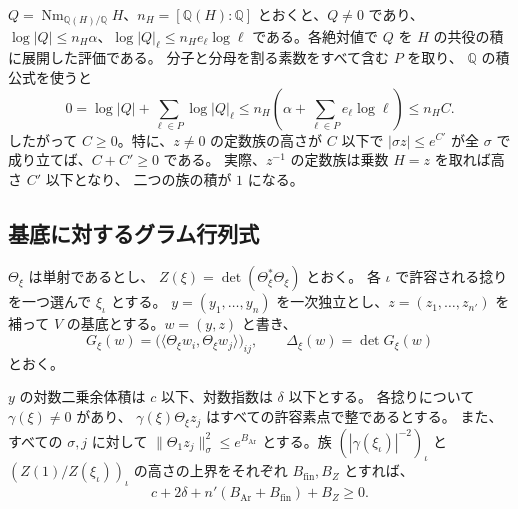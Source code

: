 \(Q=\operatorname{Nm}_{\mathbb Q(H)/\mathbb Q}H\)、\(n_H=[\mathbb Q(H):\mathbb Q]\)
とおくと、\(Q\ne0\) であり、
\(\log|Q|\le n_H\alpha\)、\(\log|Q|_\ell\le n_H e_\ell\log\ell\)
である。各絶対値で \(Q\) を \(H\) の共役の積に展開した評価である。
分子と分母を割る素数をすべて含む \(P\) を取り、
\(\mathbb Q\) の積公式を使うと
\[
 0=\log|Q|+\sum_{\ell\in P}\log|Q|_\ell
   \le n_H\left(\alpha+\sum_{\ell\in P} e_\ell\log\ell\right)
   \le n_H C .
\]
したがって \(C\ge0\)。特に、\(z\ne0\) の定数族の高さが \(C\) 以下で
\(|\sigma z|\le e^{C'}\) が全 \(\sigma\) で成り立てば、\(C+C'\ge0\) である。
実際、\(z^{-1}\) の定数族は乗数 \(H=z\) を取れば高さ \(C'\) 以下となり、
二つの族の積が \(1\) になる。

\subsection{基底に対するグラム行列式}

\(\Theta_\xi\) は単射であるとし、
\(Z(\xi)=\det(\Theta_\xi^*\Theta_\xi)\) とおく。
各 \(\iota\) で許容される捻りを一つ選んで \(\xi_\iota\) とする。
\(y=(y_1,\ldots,y_n)\) を一次独立とし、\(z=(z_1,\ldots,z_{n'})\) を補って
\(V\) の基底とする。\(w=(y,z)\) と書き、
\[
 G_\xi(w)=\bigl(\langle\Theta_\xi w_i,\Theta_\xi w_j\rangle\bigr)_{ij},
 \qquad \Delta_\xi(w)=\det G_\xi(w)
\]
とおく。

\begin{proposition}\label{prop:gram-product}
\(y\) の対数二乗余体積は \(c\) 以下、対数指数は \(\delta\) 以下とする。
各捻りについて \(\gamma(\xi)\ne0\) があり、
\(\gamma(\xi)\Theta_\xi z_j\) はすべての許容素点で整であるとする。
また、すべての \(\sigma,j\) に対して \(\|\Theta_1 z_j\|_\sigma^2\le e^{B_{\mathrm{Ar}}}\)
とする。族 \((|\gamma(\xi_\iota)|^{-2})_\iota\) と
\((Z(1)/Z(\xi_\iota))_\iota\) の高さの上界をそれぞれ \(B_{\mathrm{fin}},B_Z\) とすれば、
\begin{equation}\label{eq:gram-product}
  c+2\delta+n'(B_{\mathrm{Ar}}+B_{\mathrm{fin}})+B_Z\ge0.
\end{equation}
\end{proposition}


